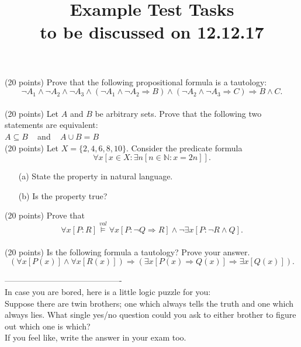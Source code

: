 \documentclass{article}
\begin{document}
\title{Example Test Tasks\\
 \small{{\bf{to be discussed on 12.12.17}}} }
\date{}

\maketitle
\thispagestyle{empty}



 (20 points) \quad Prove that the following propositional formula is a tautology:
$$\neg A_1 \wedge \neg A_2 \wedge \neg A_3 \wedge (\neg A_1 \wedge \neg A_2 \Rightarrow B) \wedge (\neg A_2 \wedge \neg A_3 \Rightarrow C)  \Rightarrow B \wedge C .$$
\\



 (20 points) \quad
Let $A$ and $B$ be arbitrary sets. Prove that the following two statements are equivalent:\\

\qquad \qquad $A \subseteq B$ \,\,\, and \,\,\, $A \cup B = B$\\


 (20 points) \quad
Let $X = \{2,4,6,8,10\}$. Consider the predicate formula
$$\forall x \left[ x \in X : \exists n \left[ n \in \mathbb{N}: x = 2n\right]\right].$$
\begin{itemize}
\item[(a)] State the property in natural language.
\item[(b)] Is the property true?	
\end{itemize}



 (20 points) \quad
Prove that
\begin{equation*}
\forall x [P:R] \stackrel{val}{\models} \forall x[P : \neg Q \Rightarrow R] \wedge \neg \exists x[P : \neg R \wedge Q].
\end{equation*}\\



 (20 points) \quad
Is the following formula a tautology?
Prove your answer. 
$$(\forall x[P(x)] \wedge \forall x[R(x)]) \Rightarrow (\exists x [P(x) \Rightarrow Q(x)] \Rightarrow \exists x[Q(x)]).$$


\noindent -------------------------------------------\\

In case you are bored, here is a little logic puzzle for you:\\

Suppose there are twin brothers; one which always tells the truth and one which always lies.  What single yes/no question could you ask to either brother to figure out which one is which?\\

If you feel like, write the answer in your exam too. 
\end{document}
